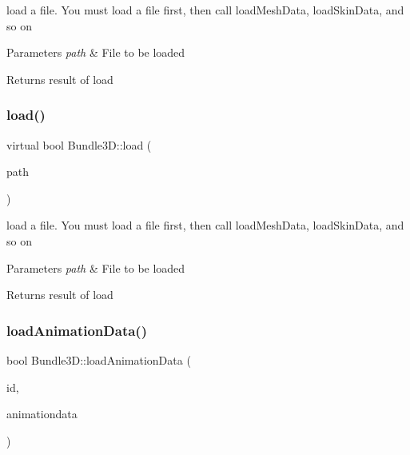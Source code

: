 load a file. You must load a file first, then call load\+Mesh\+Data, load\+Skin\+Data, and so on 
\begin{DoxyParams}{Parameters}
{\em path} & File to be loaded \\
\hline
\end{DoxyParams}
\begin{DoxyReturn}{Returns}
result of load 
\end{DoxyReturn}
\mbox{\label{classBundle3D_a3a86dcfb37941ff198572dffe0f60b74}} 
\subsubsection{\texorpdfstring{load()}{load()}\hspace{0.1cm}{\footnotesize\ttfamily [2/2]}}
{\footnotesize\ttfamily virtual bool Bundle3\+D\+::load (\begin{DoxyParamCaption}\item[{const std\+::string \&}]{path }\end{DoxyParamCaption})\hspace{0.3cm}{\ttfamily [virtual]}}

load a file. You must load a file first, then call load\+Mesh\+Data, load\+Skin\+Data, and so on 
\begin{DoxyParams}{Parameters}
{\em path} & File to be loaded \\
\hline
\end{DoxyParams}
\begin{DoxyReturn}{Returns}
result of load 
\end{DoxyReturn}
\mbox{\label{classBundle3D_a872eabde22d91ec0d412f4286e690d56}} 
\subsubsection{\texorpdfstring{load\+Animation\+Data()}{loadAnimationData()}\hspace{0.1cm}{\footnotesize\ttfamily [1/2]}}
{\footnotesize\ttfamily bool Bundle3\+D\+::load\+Animation\+Data (\begin{DoxyParamCaption}\item[{const std\+::string \&}]{id,  }\item[{\hyperlink{structAnimation3DData}{Animation3\+D\+Data} $\ast$}]{animationdata }\end{DoxyParamCaption})\hspace{0.3cm}{\ttfamily [virtual]}}

